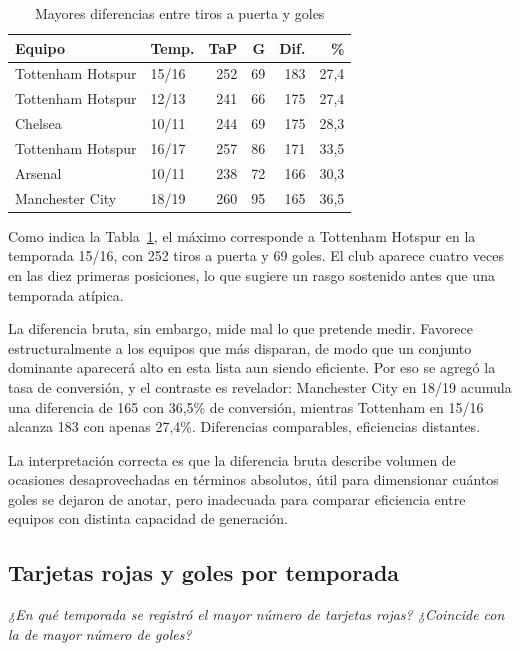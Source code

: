 \documentclass[conference]{IEEEtran}
\begin{document}
\begin{table}[htbp]
\caption{Mayores diferencias entre tiros a puerta y goles}
\label{tab:gap}
\centering
\begin{tabular}{llrrrr}
\toprule
\textbf{Equipo} & \textbf{Temp.} & \textbf{TaP} & \textbf{G} &
\textbf{Dif.} & \textbf{\%} \\
\midrule
Tottenham Hotspur & 15/16 & 252 & 69  & 183 & 27,4 \\
Tottenham Hotspur & 12/13 & 241 & 66  & 175 & 27,4 \\
Chelsea           & 10/11 & 244 & 69  & 175 & 28,3 \\
Tottenham Hotspur & 16/17 & 257 & 86  & 171 & 33,5 \\
Arsenal           & 10/11 & 238 & 72  & 166 & 30,3 \\
Manchester City   & 18/19 & 260 & 95  & 165 & 36,5 \\
\bottomrule
\end{tabular}
\end{table}

Como indica la Tabla~\ref{tab:gap}, el máximo corresponde a Tottenham Hotspur
en la temporada 15/16, con 252 tiros a puerta y 69 goles. El club aparece
cuatro veces en las diez primeras posiciones, lo que sugiere un rasgo sostenido
antes que una temporada atípica.

La diferencia bruta, sin embargo, mide mal lo que pretende medir. Favorece
estructuralmente a los equipos que más disparan, de modo que un conjunto
dominante aparecerá alto en esta lista aun siendo eficiente. Por eso se agregó
la tasa de conversión, y el contraste es revelador: Manchester City en 18/19
acumula una diferencia de 165 con 36,5\% de conversión, mientras Tottenham en
15/16 alcanza 183 con apenas 27,4\%. Diferencias comparables, eficiencias
distantes.

La interpretación correcta es que la diferencia bruta describe volumen de
ocasiones desaprovechadas en términos absolutos, útil para dimensionar cuántos
goles se dejaron de anotar, pero inadecuada para comparar eficiencia entre
equipos con distinta capacidad de generación.

\subsection{Tarjetas rojas y goles por temporada}

\emph{¿En qué temporada se registró el mayor número de tarjetas rojas?
¿Coincide con la de mayor número de goles?}
\end{document}
